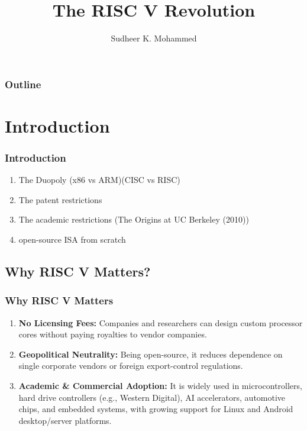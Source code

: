 \documentclass{beamer}
\institute{Bhabha Atomic Research Center}
\title{The RISC V Revolution}
\author{Sudheer K. Mohammed}
\begin{document}
\begin{frame}[plain]
 \maketitle
\end{frame}
\begin{frame}[plain]
\frametitle{Outline} %
\tableofcontents
\end{frame}
\section{Introduction}
\begin{frame}
\frametitle{Introduction}
\begin{enumerate}
\item The Duopoly (x86 vs ARM)(CISC vs RISC)
\pause
\item The patent restrictions
\pause
\item The academic restrictions (The Origins at UC Berkeley (2010))
\pause
\item open-source ISA from scratch
\end{enumerate}
\end{frame}
\subsection{Why RISC V Matters?}
\begin{frame}
\frametitle{Why RISC V Matters}
\begin{enumerate}
\item \textbf{No Licensing Fees:} Companies and researchers can design custom processor cores without paying royalties to vendor companies.

\item \textbf{Geopolitical Neutrality:} Being open-source, it reduces dependence on single corporate vendors or foreign export-control regulations.

\item \textbf{Academic \& Commercial Adoption:} It is widely used in microcontrollers, hard drive controllers (e.g., Western Digital), AI accelerators, automotive chips, and embedded systems, with growing support for Linux and Android desktop/server platforms.
\end{enumerate}

\end{frame}
\end{document}
